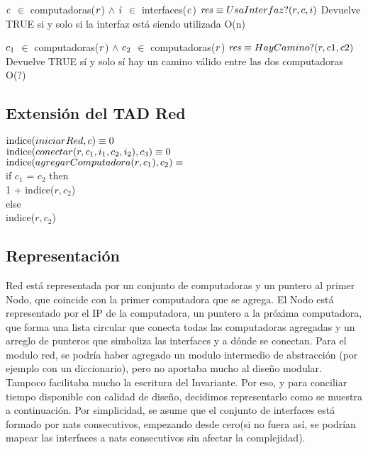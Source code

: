  {$\text{\textit{c}}$ $\in$ computadoras($\text{\textit{r}}$) $\land$ $\text{\textit{i}}$ $\in$ interfaces($\text{\textit{c}}$)}
 {$\text{\textit{res}} \equiv UsaInterfaz?(r,c,i)$}
 {Devuelve TRUE si y solo si la interfaz está siendo utilizada}
 {O(n)}

 {$\text{\textit{$c_{1}$}}$ $\in$ computadoras($\text{\textit{r}}$) $\land$ $\text{\textit{$c_{2}$}}$ $\in$ computadoras($\text{\textit{r}}$)}
 {$\text{\textit{res}} \equiv HayCamino?(r,c1,c2)$}
 {Devuelve TRUE sí y solo sí hay un camino válido entre las dos computadoras}
 {O(?)}

\subsection{Extensión del TAD Red}
$\text{\normalfont indice}(iniciarRed, c) \equiv 0$ \\
$\text{\normalfont indice}(conectar(r,c_{1},i_{1},c_{2},i_{2}), c_{3}) \equiv 0$ \\
$\text{\normalfont indice}(agregarComputadora(r,c_{1}), c_{2}) \equiv$ 
	\\ if $c_{1}$ = $c_{2}$ then \\ 1 + indice($r,c_{2}$) \\ else \\ indice($r,c_{2}$)


\subsection{Representación}
Red está representada por un conjunto de computadoras y un puntero al primer Nodo, que coincide con la primer computadora que se agrega. El Nodo está representado por el IP de la computadora, un puntero a la próxima computadora, que forma una lista circular que conecta todas las computadoras agregadas y un arreglo de punteros que simboliza las interfaces y a dónde se conectan.
Para el modulo red, se podría haber agregado un modulo intermedio de abstracción (por ejemplo con un diccionario), pero no aportaba mucho al diseño modular. Tampoco facilitaba mucho la escritura del Invariante. Por eso, y para conciliar tiempo disponible con calidad de diseño, decidimos representarlo como se muestra a continuación. Por simplicidad, se asume que el conjunto de interfaces está formado por nats consecutivos, empezando desde cero(si no fuera así, se podrían mapear las interfaces a nats consecutivos sin afectar la complejidad).

